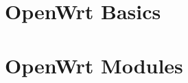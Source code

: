 


    
    
    
    

    \part{OpenWrt Basics}
        

    \part{OpenWrt Modules}
        

    

